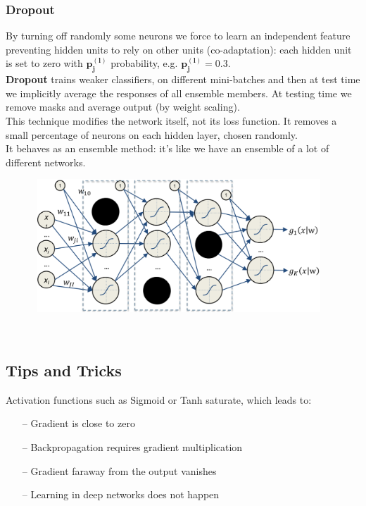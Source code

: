 \subsubsection{Dropout}
By turning off randomly some neurons we force to learn an independent feature preventing hidden units to rely on other units (co-adaptation): each hidden unit is set to zero with $\boldsymbol{p_j^{(l)}}$ probability, e.g. $\boldsymbol{p_j^{(l)}} = 0.3$. \\
\textbf{Dropout} trains weaker classifiers, on different mini-batches and then at test time we implicitly average the responses of all ensemble members. At testing time we remove masks and average output (by weight scaling). \\
This technique modifies the network itself, not its loss function. It removes a small percentage of neurons on each hidden layer, chosen randomly.\\
It behaves as an ensemble method: it's like we have an ensemble of a lot of different networks. \\

\begin{minipage}{\linewidth}
        \centering
        \includegraphics[width=13cm, height=5cm]{images/dropout.png}
        \label{fig:log_arch}
\end{minipage}\\



\subsection{Tips and Tricks}
Activation functions such as Sigmoid or Tanh saturate, which leads to:
\begin{itemize}
    \item[--] Gradient is close to zero
    \item[--] Backpropagation requires gradient multiplication
    \item[--] Gradient faraway from the output vanishes
    \item[--] Learning in deep networks does not happen
\end{itemize}{}

